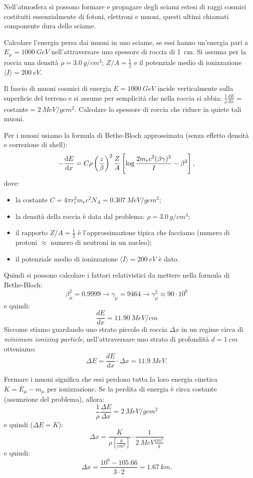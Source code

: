 \begin{Exercise}[title={Perdita di energia per ionizzazione}]
  Nell'atmosfera si possono formare e propagare degli sciami estesi di raggi cosmici costituiti essenzialmente di fotoni, elettroni e muoni, questi ultimi chiamati {\textit componente dura} dello sciame.

  \Question Calcolare l'energia persa dai muoni in uno sciame, se essi hanno un'energia pari a $E_\mu=\SI{1000}{GeV}$ nell'attraversare uno spessore di roccia di \SI{1}{cm}. Si assuma per la roccia una densit\`a $\rho=\SI{3.0}{g/cm^3}$; $Z/A=\frac{1}{2}$ e il potenziale medio di ionizzazione $\langle I \rangle=\SI{200}{eV}$.

  \Question Il fascio di muoni cosmici di energia $E=\SI{1000}{GeV}$ incide verticalmente sulla superficie del terreno e si assume per semplicit\`a che nella roccia si abbia:  $\frac{1}{\rho}\frac{dE}{dx}=$costante$=\SI{2}{MeV/g cm^2}$. Calcolare lo spessore di roccia che riduce in quiete tali muoni.  
\end{Exercise}
\begin{Answer}
  Per i muoni usiamo la formula di Bethe-Bloch approssimata (senza effetto densit\`a e correzione di shell):
  \[
-\dv{E}{x} = C\rho\left(\frac{z}{\beta}\right)^2\frac{Z}{A}\left[\log\frac{2m_ec^2(\beta\gamma)^2}{I}-\beta^2\right],
\]
dove:
\begin{itemize}
\item la costante $C=4\pi r_e^2m_ec^2N_A = \SI{0.307}{MeV/g cm^2}$;
\item la densit\`a della roccia \`e data dal problema: $\rho=\SI{3.0}{g/cm^3}$;
\item il rapporto $Z/A=\frac{1}{2}$ \`e l'approssimazione tipica che facciamo (numero di protoni $\approx$ numero di neutroni in un nucleo);
\item il potenziale medio di ionizzazione $\langle I \rangle=\SI{200}{eV}$ \`e dato.
\end{itemize}
Quindi si possono calcolare i fattori relativistici da mettere nella formula di Bethe-Bloch:
\[
\beta_\mu^2 = 0.9999 \rightarrow  \gamma_\mu = 9464 \rightarrow  \gamma_\mu^2 \approx 90 \cdot 10^6
\]
e quindi:
\[
\frac{dE}{dx} = \SI{11.90}{MeV/cm}
\]
Siccome stiamo guardando uno strato piccolo di roccia $\Delta x$ in un regime circa di \textit{minimum ionizing particle}, nell'attraversare uno strato di profondit\`a $d=\SI{1}{cm}$ otteniamo:
\[
\Delta E = \frac{dE}{dx} \cdot \Delta x = \SI{11.9}{MeV}.
\]

Fermare i muoni significa che essi perdono tutta la loro energia cinetica $K = E_\mu - m_\mu$ per ionizzazione. Se la perdita di energia \`e circa costante (assunzione del problema), allora:
\[
\frac{1}{\rho}\frac{\Delta E}{\Delta x} = \SI{2}{MeV/g cm^2}
\]
e quindi ($\Delta E = K$):
\[
\Delta x = \frac{K}{\rho \left[\frac{g}{cm^3}\right]} \cdot \frac{1}{\SI{2}{MeV \frac{cm^2}{g}}}
\]
e quindi:
\[
\Delta x  = \frac{10^6-105.66}{3 \cdot 2} = \SI{1.67}{km}.
\]
\end{Answer}



